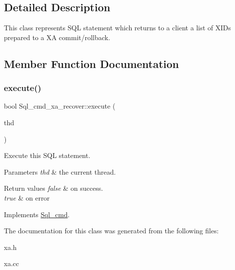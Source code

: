 \subsection{Detailed Description}
This class represents S\+QL statement which returns to a client a list of X\+ID\textquotesingle{}s prepared to a XA commit/rollback. 

\subsection{Member Function Documentation}
\mbox{\label{classSql__cmd__xa__recover_a48a61d21f733c261c49e5f93d7ecec26}} 
\subsubsection{\texorpdfstring{execute()}{execute()}}
{\footnotesize\ttfamily bool Sql\+\_\+cmd\+\_\+xa\+\_\+recover\+::execute (\begin{DoxyParamCaption}\item[{T\+HD $\ast$}]{thd }\end{DoxyParamCaption})\hspace{0.3cm}{\ttfamily [virtual]}}

Execute this S\+QL statement. 
\begin{DoxyParams}{Parameters}
{\em thd} & the current thread. \\
\hline
\end{DoxyParams}

\begin{DoxyRetVals}{Return values}
{\em false} & on success. \\
\hline
{\em true} & on error \\
\hline
\end{DoxyRetVals}


Implements \mbox{\hyperlink{classSql__cmd_a213367b79b551296fbb7790f2a3732fb}{Sql\+\_\+cmd}}.



The documentation for this class was generated from the following files\+:\begin{DoxyCompactItemize}
\item 
xa.\+h\item 
xa.\+cc\end{DoxyCompactItemize}
